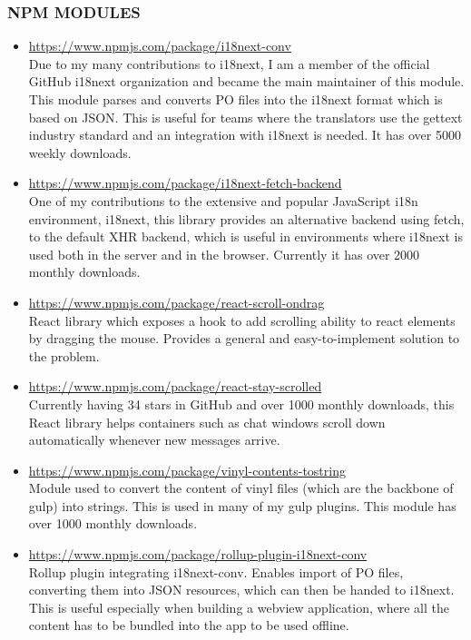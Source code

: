 \documentclass{res}
\begin{document}
\begin{resume}
\subsubsection{NPM MODULES}

\begin{itemize}
  \item \url{https://www.npmjs.com/package/i18next-conv} \\
  Due to my many contributions to i18next, I am a member of the official
  GitHub i18next organization and became the main maintainer of this module.
  This module parses and converts PO files into the i18next format which
  is based on JSON. This is useful for teams where the translators use
  the gettext industry standard and an integration with i18next is needed.
  It has over 5000 weekly downloads.

  \item \url{https://www.npmjs.com/package/i18next-fetch-backend} \\
  One of my contributions to the extensive and popular JavaScript i18n
  environment, i18next, this library provides an alternative backend
  using fetch, to the default XHR backend, which is useful in environments
  where i18next is used both in the server and in the browser.
  Currently it has over 2000 monthly downloads.

  \item \url{https://www.npmjs.com/package/react-scroll-ondrag} \\
  React library which exposes a hook to add scrolling ability to react
  elements by dragging the mouse. Provides a general and easy-to-implement
  solution to the problem.

  \item \url{https://www.npmjs.com/package/react-stay-scrolled} \\
  Currently having 34 stars in GitHub and over 1000 monthly downloads,
  this React library helps containers such as chat windows scroll down
  automatically whenever new messages arrive.

  \item \url{https://www.npmjs.com/package/vinyl-contents-tostring} \\
  Module used to convert the content of vinyl files (which are the backbone
  of gulp) into strings. This is used in many of my gulp plugins.
  This module has over 1000 monthly downloads.

  \item \url{https://www.npmjs.com/package/rollup-plugin-i18next-conv} \\
  Rollup plugin integrating i18next-conv. Enables import of PO files,
  converting them into JSON resources, which can then be handed to
  i18next.
  This is useful especially when building a webview application, where
  all the content has to be bundled into the app to be used offline.


\end{itemize}
\end{resume}
\end{document}
